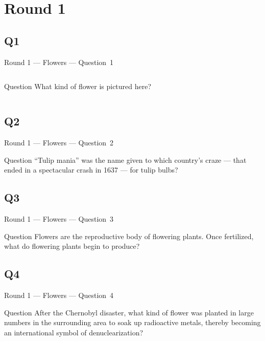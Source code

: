 \documentclass[11pt]{beamer}
\begin{document}
\section{Round 1}
\subsection*{Q1}
\begin{frame}[t]{Round 1 --- Flowers --- \mbox{Question 1}}
\vspace{-0.5em}
\begin{columns}[T,totalwidth=\linewidth]
\begin{column}{0.32\linewidth}
\begin{block}{Question}
What kind of flower is pictured here?
\end{block}
\end{column}
\begin{column}{0.65\linewidth}
\begin{center}
\texttt{[image: \{Images/bop]}.jpg}
\end{center}
\end{column}
\end{columns}
\end{frame}
\subsection*{Q2}
\begin{frame}[t]{Round 1 --- Flowers --- \mbox{Question 2}}
\vspace{-0.5em}
\begin{block}{Question}
``Tulip mania'' was the name given to which country's craze --- that ended in a spectacular crash in 1637 --- for tulip bulbs?
\end{block}
\end{frame}
\subsection*{Q3}
\begin{frame}[t]{Round 1 --- Flowers --- \mbox{Question 3}}
\vspace{-0.5em}
\begin{block}{Question}
Flowers are the reproductive body of flowering plants. Once  fertilized, what do flowering plants begin to produce?
\end{block}
\end{frame}
\subsection*{Q4}
\begin{frame}[t]{Round 1 --- Flowers --- \mbox{Question 4}}
\vspace{-0.5em}
\begin{block}{Question}
After the Chernobyl disaster, what kind of flower was planted in large numbers in the surrounding area to soak up radioactive metals, thereby becoming an international symbol of denuclearization?
\end{block}
\end{frame}
\end{document}

